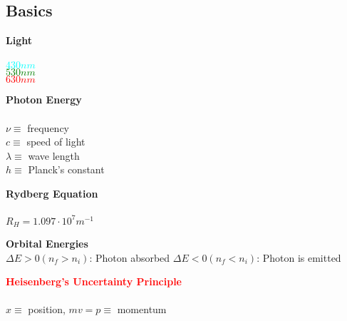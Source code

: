 \subsection{Basics}
\begin{minipage}{0.15\columnwidth}
\begin{center}
\textbf{Light}\\
 \\
    \textcolor{cyan}{$430nm$}\\
    \textcolor{green}{$530nm$}\\
    \textcolor{red}{$630nm$}\\
\end{center}
  
\end{minipage}
\begin{minipage}{0.20\columnwidth}

\begin{center}
\textbf{Photon Energy}\\
\\
$\nu \equiv$ frequency\\
$c \equiv$ speed of light\\
$\lambda \equiv$ wave length\\
$h \equiv$ Planck's constant 
\end{center}

\end{minipage}
\begin{minipage}{0.25\columnwidth}
\begin{center}
   \textbf{Rydberg Equation}\\ 
   \\
   $R_H = 1.097 \cdot 10^7 m^{-1}$
\end{center}
    
\end{minipage}
\begin{minipage}{0.4\columnwidth}
    \begin{center}
        \textbf{Orbital Energies}\\
        $\Delta E > 0 (n_f > n_i)$: Photon absorbed
        $\Delta E < 0 (n_f < n_i)$: Photon is emitted 
    \end{center}
\end{minipage}
\textcolor{red}{\textbf{Heisenberg's Uncertainty Principle}}\\
\\
 $x \equiv$ position, $mv = p \equiv$ momentum